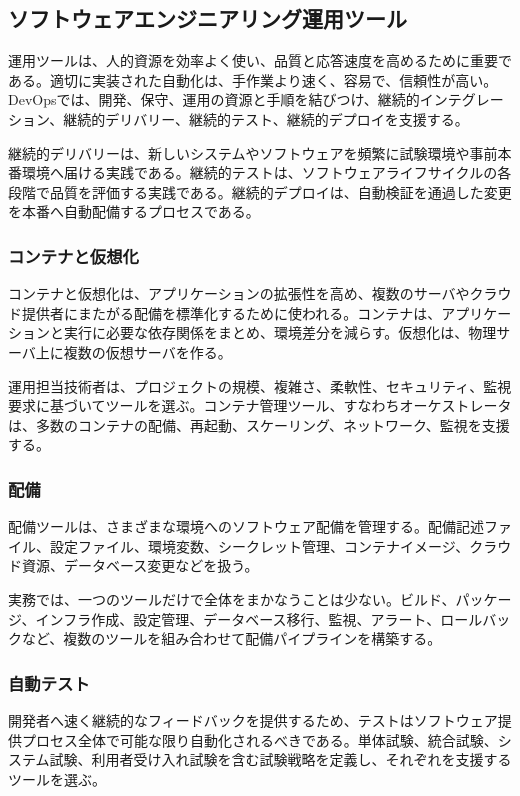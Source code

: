 \subsection{ソフトウェアエンジニアリング運用ツール}

運用ツールは、人的資源を効率よく使い、品質と応答速度を高めるために重要である。適切に実装された自動化は、手作業より速く、容易で、信頼性が高い。DevOpsでは、開発、保守、運用の資源と手順を結びつけ、継続的インテグレーション、継続的デリバリー、継続的テスト、継続的デプロイを支援する。

継続的デリバリーは、新しいシステムやソフトウェアを頻繁に試験環境や事前本番環境へ届ける実践である。継続的テストは、ソフトウェアライフサイクルの各段階で品質を評価する実践である。継続的デプロイは、自動検証を通過した変更を本番へ自動配備するプロセスである。

\subsubsection{コンテナと仮想化}

コンテナと仮想化は、アプリケーションの拡張性を高め、複数のサーバやクラウド提供者にまたがる配備を標準化するために使われる。コンテナは、アプリケーションと実行に必要な依存関係をまとめ、環境差分を減らす。仮想化は、物理サーバ上に複数の仮想サーバを作る。

運用担当技術者は、プロジェクトの規模、複雑さ、柔軟性、セキュリティ、監視要求に基づいてツールを選ぶ。コンテナ管理ツール、すなわちオーケストレータは、多数のコンテナの配備、再起動、スケーリング、ネットワーク、監視を支援する。

\subsubsection{配備}

配備ツールは、さまざまな環境へのソフトウェア配備を管理する。配備記述ファイル、設定ファイル、環境変数、シークレット管理、コンテナイメージ、クラウド資源、データベース変更などを扱う。

実務では、一つのツールだけで全体をまかなうことは少ない。ビルド、パッケージ、インフラ作成、設定管理、データベース移行、監視、アラート、ロールバックなど、複数のツールを組み合わせて配備パイプラインを構築する。

\subsubsection{自動テスト}

開発者へ速く継続的なフィードバックを提供するため、テストはソフトウェア提供プロセス全体で可能な限り自動化されるべきである。単体試験、統合試験、システム試験、利用者受け入れ試験を含む試験戦略を定義し、それぞれを支援するツールを選ぶ。

